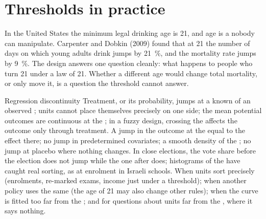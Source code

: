 \section{Thresholds in practice}\label{sec:b3:regression-discontinuity:applications}

\begin{record}
In the United States the minimum legal drinking age is 21, and age is a  nobody can manipulate. Carpenter and Dobkin (2009) found that at 21 the
number of days on which young adults drink jumps by 21~\%, and the mortality
rate jumps by 9~\%. %
The design answers one question cleanly: what happens to people who turn 21
under a law of 21. Whether a different age would change total mortality, or
only move it, is a question the threshold cannot answer.
\end{record}

\begin{model}{Regression discontinuity}
\assumes Treatment, or its probability, jumps at a known  of an observed
; units cannot place themselves precisely on one side; the
mean potential outcomes are continuous at the ; in a fuzzy design,
crossing the  affects the outcome only through treatment.
\predicts A jump in the outcome at the  equal to the effect there; no jump
in predetermined covariates; a smooth density of the ; no jump at
placebo  where nothing changes.
\tested In close elections, the vote share before the election does not jump
while the one after does; histograms of the  have caught real
sorting, as at enrolment  in Israeli schools.
\breaks When units sort precisely (enrolments, re-marked exams, income just under
a threshold); when another policy uses the same  (the age of 21 may also
change other rules); when the curve is fitted too far from the ; and
for questions about units far from the , where it says nothing.
\end{model}

